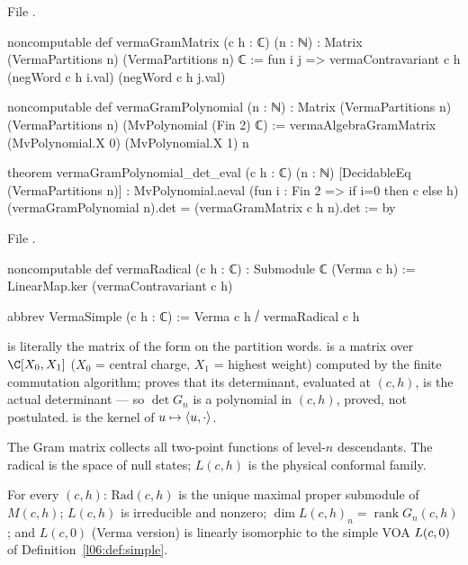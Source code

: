 File .
\begin{leancode}
noncomputable def vermaGramMatrix (c h : ℂ) (n : ℕ) :
    Matrix (VermaPartitions n) (VermaPartitions n) ℂ := fun i j =>
  vermaContravariant c h (negWord c h i.val) (negWord c h j.val)

noncomputable def vermaGramPolynomial (n : ℕ) :
    Matrix (VermaPartitions n) (VermaPartitions n) (MvPolynomial (Fin 2) ℂ) :=
  vermaAlgebraGramMatrix (MvPolynomial.X 0) (MvPolynomial.X 1) n

theorem vermaGramPolynomial_det_eval (c h : ℂ) (n : ℕ) [DecidableEq (VermaPartitions n)] :
    MvPolynomial.aeval (fun i : Fin 2 => if i=0 then c else h)
      (vermaGramPolynomial n).det = (vermaGramMatrix c h n).det := by
\end{leancode}
File .
\begin{leancode}
noncomputable def vermaRadical (c h : ℂ) : Submodule ℂ (Verma c h) :=
  LinearMap.ker (vermaContravariant c h)

abbrev VermaSimple (c h : ℂ) := Verma c h ⧸ vermaRadical c h
\end{leancode}

\begin{dictionary}
 is literally the matrix of the form on the partition words. 
 is a matrix over $\C[X_0,X_1]$ ($X_0$ = central charge, $X_1$ = highest
weight) computed by the finite commutation algorithm; \allowbreak{}\allowbreak{} proves that
its determinant, evaluated at $(c,h)$, is the actual determinant --- so $\det G_n$ is a polynomial in
$(c,h)$, proved, not postulated.  is the kernel of $u\mapsto\langle u,\cdot\rangle$.
\end{dictionary}

\begin{physics}
The Gram matrix collects all two-point functions of level-$n$ descendants. The radical is the space of
null states; $L(c,h)$ is the physical conformal family.
\end{physics}

\begin{theorem}\label{l06:thm:radical}
For every $(c,h)$: $\mathrm{Rad}(c,h)$ is the unique maximal proper submodule of $M(c,h)$; $L(c,h)$ is
irreducible and nonzero; $\dim L(c,h)_n = \operatorname{rank}G_n(c,h)$; and $L(c,0)$ (Verma version) is
linearly isomorphic to the simple VOA $L(c,0)$ of Definition~\ref{l06:def:simple}.
\end{theorem}

